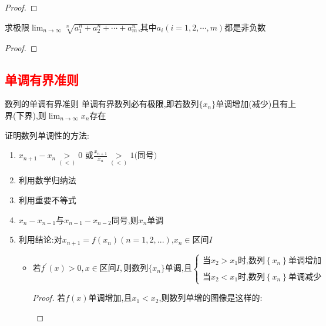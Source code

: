 \documentclass[12pt, a4paper, oneside, UTF8]{ctexbook}
\begin{document}
\begin{sloppypar}
\begin{proof}
        \end{proof}
        \begin{problem}
            求极限$\lim_{n\to\infty}\sqrt[n]{a_1^n+a_2^n+\cdots+a_m^n}$,其中$a_i(i=1,2,\cdots,m)$都是非负数
        \end{problem}
        \begin{proof}
            
        \end{proof}

    \subsection{\textcolor{red}{单调有界准则}}
    \begin{them}{数列的单调有界准则}{}
        单调有界数列必有极限,即若数列$\{x_n\}$单调增加(减少)且有上界(下界),则$\lim_{n \to \infty} x_n$存在
    \end{them}
    证明数列单调性的方法:
        \begin{enumerate}
            \item $x_{n+1}-x_{n}\underset{(<)}{\operatorname*{>}}0\text{ 或}\frac{x_{n+1}}{x_{n}}\underset{(<)}{\operatorname*{>}}1\text{(同号})$
            \item 利用数学归纳法
            \item 利用重要不等式
            \item $x_n-x_{n-1}$与$x_{n-1}-x_{n-2}$同号,则${x_n}$单调
            \item 利用结论:对$x_{n+1}=f(x_n)(n=1,2,...)$,$x_n \in \text{区间}I$
            \begin{itemize}
                \item $\text{若} f^{\prime}(x) > 0, x \in \text{区间}I, \text{则数列} \{x_n\} \text{单调,且}\left\{\begin{array}{l}\text{当}x_2>x_1\text{时,数列}\left\{x_n\right\}\text{单调增加}\\\\\text{当}x_2<x_1\text{时,数列}\left\{x_n\right\}\text{单调减少}\end{array}\right.$
                \begin{proof}
                    若$f(x)$单调增加,且$x_1<x_2$,则数列单增的图像是这样的:
                    \begin{center}
                        \begin{tikzpicture}[x=0.75pt,y=0.75pt,yscale=-1,xscale=1]

\end{tikzpicture}
\end{center}
\end{proof}
\end{itemize}
\end{enumerate}
\end{sloppypar}
\end{document}
